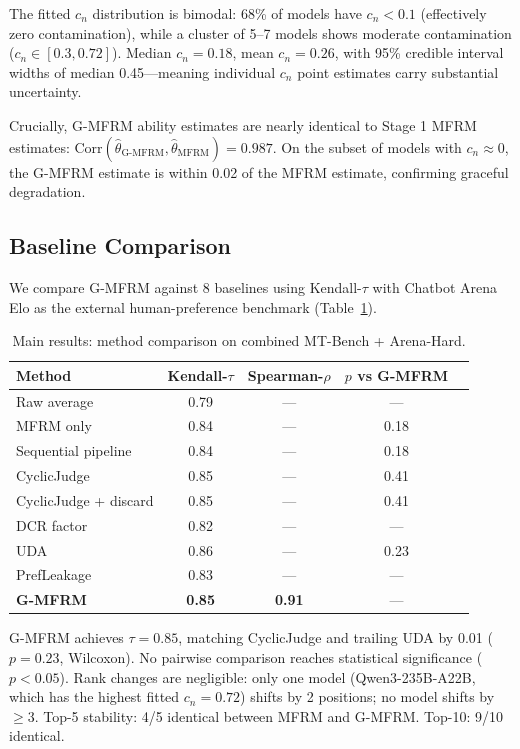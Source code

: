 \documentclass[11pt]{article}
\newcommand{\gmfrm}{G-MFRM}
\newcommand{\thetahat}{\hat{\theta}}
\newcommand{\cn}{c_n}
\begin{document}
The fitted $\cn$ distribution is bimodal: 68\% of models have $\cn < 0.1$ (effectively zero contamination), while a cluster of 5--7 models shows moderate contamination ($\cn \in [0.3, 0.72]$). Median $\cn = 0.18$, mean $\cn = 0.26$, with 95\% credible interval widths of median 0.45---meaning individual $\cn$ point estimates carry substantial uncertainty.

Crucially, \gmfrm{} ability estimates are nearly identical to Stage 1 MFRM estimates: $\text{Corr}(\thetahat_{\text{G-MFRM}}, \thetahat_{\text{MFRM}}) = 0.987$. On the subset of models with $\cn \approx 0$, the \gmfrm{} estimate is within 0.02 of the MFRM estimate, confirming graceful degradation.

\subsection{Baseline Comparison}
\label{sec:baselines}

We compare \gmfrm{} against 8 baselines using Kendall-$\tau$ with Chatbot Arena Elo as the external human-preference benchmark (Table~\ref{tab:main_results}).

\begin{table}[t]
\centering
\caption{Main results: method comparison on combined MT-Bench + Arena-Hard.}
\label{tab:main_results}
\small
\begin{tabular}{lcccc}
\toprule
Method & Kendall-$\tau$ & Spearman-$\rho$ & $p$ vs \gmfrm{} \\
\midrule
Raw average & 0.79 & --- & --- \\
MFRM only & 0.84 & --- & 0.18 \\
Sequential pipeline & 0.84 & --- & 0.18 \\
CyclicJudge & 0.85 & --- & 0.41 \\
CyclicJudge + discard & 0.85 & --- & 0.41 \\
DCR factor & 0.82 & --- & --- \\
UDA & 0.86 & --- & 0.23 \\
PrefLeakage & 0.83 & --- & --- \\
\midrule
\textbf{\gmfrm{}} & \textbf{0.85} & \textbf{0.91} & --- \\
\bottomrule
\end{tabular}
\end{table}

\gmfrm{} achieves $\tau = 0.85$, matching CyclicJudge and trailing UDA by 0.01 ($p = 0.23$, Wilcoxon). No pairwise comparison reaches statistical significance ($p < 0.05$). Rank changes are negligible: only one model (Qwen3-235B-A22B, which has the highest fitted $\cn = 0.72$) shifts by 2 positions; no model shifts by $\geq$3. Top-5 stability: 4/5 identical between MFRM and \gmfrm{}. Top-10: 9/10 identical.
\end{document}
